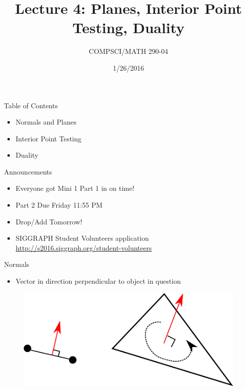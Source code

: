 \documentclass{beamer}
\title{Lecture 4: Planes, Interior Point Testing, Duality}
\date{1/26/2016}
\institute{Chris Tralie, Duke University}
\author{COMPSCI/MATH 290-04}
\begin{document}
\frame{\titlepage}



\begin{frame}{Table of Contents}

\begin{itemize}[label=$\blacktriangleright$]
	\item Normals and Planes
\end{itemize}
\begin{itemize}[label=$\vartriangleright$]
    \item Interior Point Testing
    \item Duality
\end{itemize}

\end{frame}

\begin{frame}{Announcements}

\begin{itemize}[label=$\blacktriangleright$]
    \item Everyone got Mini 1 Part 1 in on time!
    \item Part 2 Due Friday 11:55 PM
    \item Drop/Add Tomorrow!
    \item SIGGRAPH Student Volunteers application 
    \small
    \url{http://s2016.siggraph.org/student-volunteers}
\end{itemize}

\end{frame}

\begin{frame}{Normals}
\begin{itemize}[label=$\vartriangleright$]
    \item Vector in direction perpendicular to object in question
\end{itemize}

\begin{figure}[t]
	\centering
	\includegraphics[width=1\textwidth]{NormalExamples.pdf}
\end{figure}

\end{frame}
\end{document}
